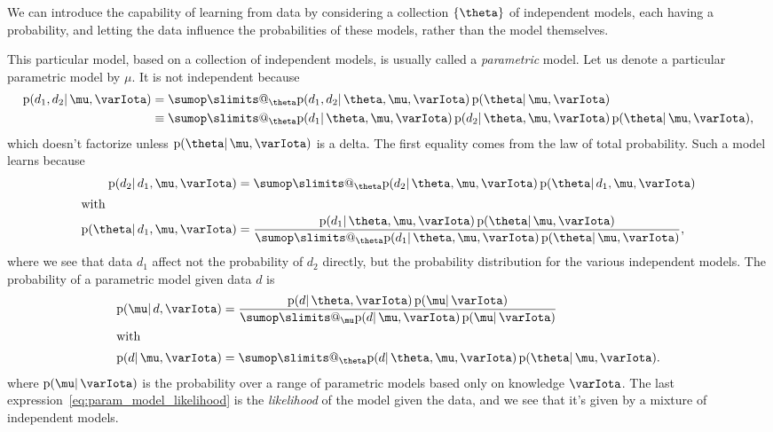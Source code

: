 \documentclass[\ifafour a4paper,12pt,\else a5paper,10pt,\fi%
onecolumn,oneside,article,%
british%
]{memoir}
\makeatletter
\theoremstyle{remark}
\theoremstyle{innote}
\def\sum{\DOTSI\sumop\slimits@}
\DeclarePairedDelimiter\set{\{}{\}}
\newcommand*{\pf}{\mathrm{p}}%
\renewcommand*{\|}{\mathpunct{|}}
\newcommand*{\yI}{\varIota}
\newcommand*{\yth}{\theta}
\newcommand*{\ymu}{\mu}
\makeatother
\begin{document}
\medskip

We can introduce the capability of learning from data by considering a
collection $\set{\yth}$ of independent models, each having a probability,
and letting the data influence the probabilities of these models, rather
than the model themselves.

This particular model, based on a collection of independent models, is
usually called a \emph{parametric} model. Let us denote a particular
parametric model by $\ymu$. It is not independent because
\begin{equation}
  \label{eq:param_model}
  \begin{aligned}
  \pf(d_1,d_2 \| \ymu, \yI) &=
\sum_{\yth}
\pf(d_1,d_2 \|\yth,\ymu,\yI) \, \pf(\yth \| \ymu,\yI)
\\&\equiv
\sum_{\yth}
\pf(d_1 \|\yth,\ymu,\yI) \, \pf(d_2 \|\yth,\ymu,\yI)
 \, \pf(\yth \| \ymu,\yI),
  \end{aligned}
\end{equation}
which doesn't factorize unless $\pf(\yth \| \ymu,\yI)$ is a delta. The
first equality comes from the law of total probability. Such a model learns
because
\begin{subequations}
    \label{eq:param_model_learn}
  \begin{align}
    \pf(d_2 \| d_1, \ymu, \yI) &=
    \sum_{\yth}
    \pf(d_2 \|\yth,\ymu,\yI) \, \pf(\yth \| d_1, \ymu,\yI)
    \\
    \shortintertext{with}
    \pf(\yth \| d_1, \ymu,\yI)
    &= \frac{
      \pf(d_1 \|\yth,\ymu,\yI) \, \pf(\yth \| \ymu,\yI)
      }{
      \sum_{\yth} \pf(d_1 \|\yth,\ymu,\yI) \, \pf(\yth \| \ymu,\yI)
      },
  \end{align}
\end{subequations}
where we see that data $d_1$ affect not the probability of $d_2$ directly,
but the probability distribution for the various independent models. The
probability of a parametric model given data $d$ is
\begin{subequations}
  \label{eq:prob_indep_model}
  \begin{align}
    \pf(\ymu \| d, \yI)
    &= \frac{
      \pf(d \|\yth,\yI) \, \pf(\ymu \| \yI)
      }{
      \sum_{\ymu}\pf(d \|\ymu,\yI) \, \pf(\ymu \| \yI)
      }
    \\
    \shortintertext{with}
    \label{eq:param_model_likelihood}
    \pf(d \|\ymu,\yI)
    & =  
      \sum_{\yth}
      \pf(d \|\yth,\ymu,\yI) \, \pf(\yth \| \ymu,\yI).
  \end{align}
\end{subequations}
where $\pf(\ymu \|\yI)$ is the probability over a range of parametric
models based only on knowledge $\yI$. The last
expression~\eqref{eq:param_model_likelihood} is the \emph{likelihood} of
the model given the data, and we see that it's given by a mixture of
independent models.
\end{document}
